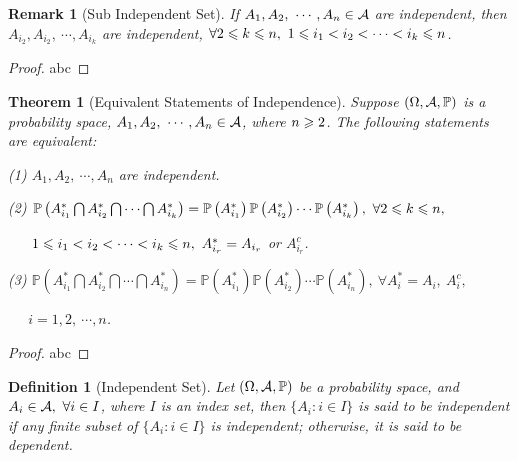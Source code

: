 \documentclass[openany,12pt]{book}
\newtheorem{theorem}{Theorem}[chapter]
\newtheorem{remark}{Remark}[chapter]
\newtheorem{definition}{Definition}[chapter]
\begin{document}
\begin{remark}[Sub Independent Set]
If $A_1,A_2,\ \cdots,A_n\in\ma$ are independent, then $A_{i_2},A_{i_2},\ \cdots,A_{i_k}$ are independent, $\forall 2\leqslant k\leqslant n,\ 1\leqslant i_1<i_2<\cdots <i_k\leqslant n$. 
\end{remark}

\begin{proof}
  abc
\end{proof}

\begin{theorem}[Equivalent Statements of Independence]
Suppose $(\Omega,\mathcal{A},\mathbb{P})$ is a probability space, $A_1,A_2,\ \cdots,A_n\in\ma$, where $n\geqslant2$. The following statements are equivalent:

(1) $A_1,A_2,\ \cdots,A_n$ are independent.

(2) $\mathbb{P}\left(A_{i_1}^*\bigcap A_{i_2}^*\bigcap\cdots\bigcap A_{i_k}^*\right)=\mathbb{P}\left(A_{i_1}^*\right) \mathbb{P}\left(A_{i_2}^* \right)\cdots \mathbb{P}\left(A_{i_k}^* \right),\ \forall 2\leqslant k\leqslant n,$

$\quad\ \ 1\leqslant i_1<i_2<\cdots <i_k\leqslant n,\ A_{i_r}^*=A_{i_r}$ or $A_{i_r}^c$.
       
(3) $\mathbb{P}\left(A_{i_1}^*\bigcap A_{i_2}^*\bigcap\cdots\bigcap A_{i_n}^*\right)=\mathbb{P}\left(A_{i_1}^* \right)\mathbb{P}\left(A_{i_2}^* \right)\cdots \mathbb{P}\left(A_{i_n}^* \right),\ \forall A_i^*=A_i,\ A_i^c,$

$\quad\ \  i=1,2,\ \cdots,n$.

\end{theorem}

\begin{proof}
  abc
\end{proof}

\begin{definition}[Independent Set]
Let $(\Omega,\mathcal{A},\mathbb{P})$ be a probability space, and $A_i\in\mathcal{A},\ \forall i\in I$, where $I$ is an index set, then $\{A_i: i\in I\}$ is said to be independent if any finite subset of $\{A_i: i\in I\}$ is independent; otherwise, it is said to be dependent.
\end{definition}
\end{document}
